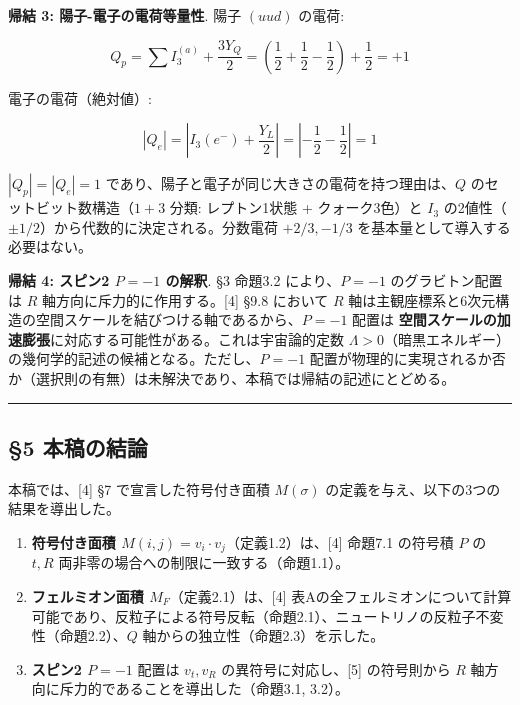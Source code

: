 \documentclass[
  a4paper,11pt]{ltjsarticle}
\providecommand{\tightlist}{%
  \setlength{\itemsep}{0pt}\setlength{\parskip}{0pt}}
\begin{document}
\textbf{帰結 3: 陽子-電子の電荷等量性}. 陽子 \((uud)\) の電荷:

\[Q_p = \sum I_3^{(a)} + \frac{3 Y_Q}{2} = \left(\frac{1}{2} + \frac{1}{2} - \frac{1}{2}\right) + \frac{1}{2} = +1\]

電子の電荷（絶対値）:

\[|Q_e| = \left|I_3(e^-) + \frac{Y_L}{2}\right| = \left|-\frac{1}{2} - \frac{1}{2}\right| = 1\]

\(|Q_p| = |Q_e| = 1\)
であり、陽子と電子が同じ大きさの電荷を持つ理由は、\(Q\)
のセットビット数構造（\(1 + 3\) 分類: レプトン1状態 + クォーク3色）と
\(I_3\) の2値性（\(\pm 1/2\)）から代数的に決定される。分数電荷
\(+2/3, -1/3\) を基本量として導入する必要はない。

\textbf{帰結 4: スピン2 \(P = -1\) の解釈}. §3 命題3.2
により、\(P = -1\) のグラビトン配置は \(R\)
軸方向に斥力的に作用する。{[}4{]} §9.8 において \(R\)
軸は主観座標系と6次元構造の空間スケールを結びつける軸であるから、\(P = -1\)
配置は
\textbf{空間スケールの加速膨張}に対応する可能性がある。これは宇宙論的定数
\(\Lambda > 0\)（暗黒エネルギー）の幾何学的記述の候補となる。ただし、\(P = -1\)
配置が物理的に実現されるか否か（選択則の有無）は未解決であり、本稿では帰結の記述にとどめる。

\begin{center}\rule{0.5\linewidth}{0.5pt}\end{center}

\subsection{§5 本稿の結論}\label{ux672cux7a3fux306eux7d50ux8ad6}

本稿では、{[}4{]} §7 で宣言した符号付き面積 \(M(\sigma)\)
の定義を与え、以下の3つの結果を導出した。

\begin{enumerate}
\def\labelenumi{\arabic{enumi}.}
\tightlist
\item
  \textbf{符号付き面積 \(M(i,j) = v_i \cdot v_j\)}（定義1.2）は、{[}4{]}
  命題7.1 の符号積 \(P\) の \(t, R\)
  両非零の場合への制限に一致する（命題1.1）。
\item
  \textbf{フェルミオン面積 \(M_F\)}（定義2.1）は、{[}4{]}
  表Aの全フェルミオンについて計算可能であり、反粒子による符号反転（命題2.1）、ニュートリノの反粒子不変性（命題2.2）、\(Q\)
  軸からの独立性（命題2.3）を示した。
\item
  \textbf{スピン2 \(P = -1\)} 配置は \(v_t, v_R\)
  の異符号に対応し、{[}5{]} の符号則から \(R\)
  軸方向に斥力的であることを導出した（命題3.1, 3.2）。
\end{enumerate}
\end{document}
